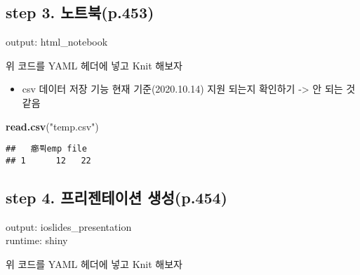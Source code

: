 \documentclass[
]{article}
\newenvironment{Shaded}{\begin{snugshade}}{\end{snugshade}}
\newcommand{\KeywordTok}[1]{\textcolor[rgb]{0.13,0.29,0.53}{\textbf{#1}}}
\newcommand{\NormalTok}[1]{#1}
\newcommand{\StringTok}[1]{\textcolor[rgb]{0.31,0.60,0.02}{#1}}
\providecommand{\tightlist}{%
  \setlength{\itemsep}{0pt}\setlength{\parskip}{0pt}}
\begin{document}
\hypertarget{step-3.-uxb178uxd2b8uxbd81p.453}{%
\subsection{step 3.
노트북(p.453)}\label{step-3.-uxb178uxd2b8uxbd81p.453}}

output: html\_notebook

위 코드를 YAML 헤더에 넣고 Knit 해보자

\begin{itemize}
\tightlist
\item
  csv 데이터 저장 기능 현재 기준(2020.10.14) 지원 되는지 확인하기
  -\textgreater{} 안 되는 것 같음
\end{itemize}

\begin{Shaded}
\begin{Highlighting}[]
\KeywordTok{read.csv}\NormalTok{(}\StringTok{"temp.csv"}\NormalTok{)}
\end{Highlighting}
\end{Shaded}

\begin{verbatim}
##   癤퓍emp file
## 1      12   22
\end{verbatim}

\hypertarget{step-4.-uxd504uxb9acuxc820uxd14cuxc774uxc158-uxc0dduxc131p.454}{%
\subsection{step 4. 프리젠테이션
생성(p.454)}\label{step-4.-uxd504uxb9acuxc820uxd14cuxc774uxc158-uxc0dduxc131p.454}}

output: ioslides\_presentation\\
runtime: shiny

위 코드를 YAML 헤더에 넣고 Knit 해보자
\end{document}
